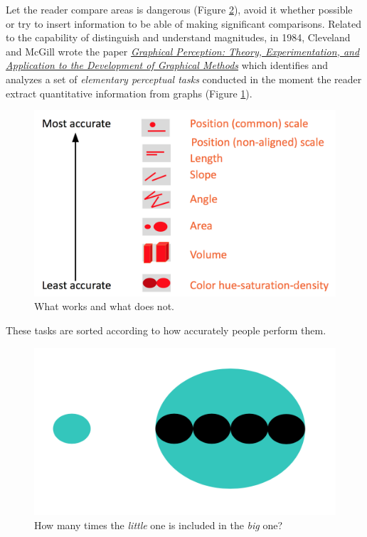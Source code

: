 Let the reader compare areas is dangerous (Figure  \ref{pic:area}), avoid it whether possible or try to insert information to be able of making significant comparisons. Related to the capability of distinguish and understand magnitudes, in 1984, Cleveland and McGill wrote the paper
\href{https://www.cs.ubc.ca/\~tmm/courses/cpsc533c-04-spr/readings/cleveland.pdf}{\emph{Graphical Perception: Theory, Experimentation, and Application to the Development of Graphical Methods}} which identifies and analyzes a set of \emph{elementary perceptual tasks} conducted in the moment the reader extract quantitative information from graphs (Figure \ref{pic:magnitude}). 

\begin{figure}[H]%
 \centering
 \includegraphics[width=13cm]{./img/06/magnitude}
 \caption{\label{pic:magnitude} What works and what does not.}
\end{figure}


These tasks are sorted according to how accurately people perform them.

\begin{figure}[h]%
 \centering
 \includegraphics[width=13cm]{./img/06/area}
 \caption{\label{pic:area} How many times the \emph{little} one is included in the \emph{big} one?}
\end{figure}

